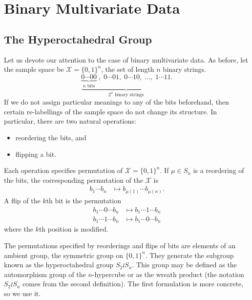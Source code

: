 \documentclass[cclicense]{hmcthesis}
\providecommand*{\xs}{\mathcal X}
\numberwithin{equation}{chapter}
\numberwithin{thmcounter}{chapter}
\begin{document}
\chapter{Binary Multivariate Data}

\section{The Hyperoctahedral Group}
    Let us devote our attention to the case of binary multivariate data.  As
    before, let the sample space be $\xs = \{0, 1\}^n$, the set of length $n$
    binary strings.
    \[
        \underbrace{
        \underbrace{0\cdots00}_\text{$n$ bits}\;,\;
        0\cdots01,\;
        0\cdots10,\;
        \ldots,\;
        1\cdots11
        }_\text{$2^n$ binary strings}.
    \]
    If we do not assign particular meanings to any of the bits beforehand, then
    certain re-labellings of the sample space do not change its structure.  In
    particular, there are two natural operations:
    \begin{itemize}\nospace
    \item reordering the bits, and
    \item flipping a bit.
    \end{itemize}
    Each operation specifies permutation of $\xs = \{0, 1\}^n$.  If $\mu \in
    S_n$ is a reordering of the bits, the corresponding permutation of the
    $\xs$  is
    \begin{align*}
        b_1 \cdots b_n &\mapsto b_{\mu(1)} \cdots b_{\mu(n)}.
    \end{align*}
    A flip of the $k$th bit is the permutation
    \begin{align*}
        b_1 \cdots 0 \cdots b_n 
        &\mapsto
        b_1 \cdots 1 \cdots b_n  \\
        b_1 \cdots 1 \cdots b_n 
        &\mapsto
        b_1 \cdots 0 \cdots b_n
    \end{align*}
    where the $k$th position is modified.  
    
    The permutations specified by reorderings and flips of bits are elements of
    an ambient group, the symmetric group on $\{0, 1\}^n$.  They generate the
    subgroup known as the hyperoctahedral group $S_2 \wr S_n$.  This group may
    be defined as the automorphism group of the $n$-hypercube or as the wreath
    product (the notation $S_2 \wr S_n$ comes from the second definition).  The
    first formulation is more concrete, so we use it.
\end{document}

